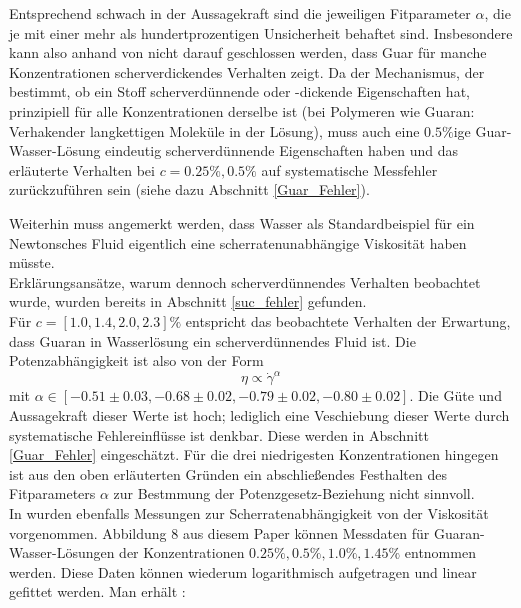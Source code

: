 \documentclass[11pt,a4paper,oneside]{scrartcl}
\begin{document}
Entsprechend schwach in der Aussagekraft sind die jeweiligen Fitparameter $\alpha$, die je mit einer mehr als hundertprozentigen Unsicherheit behaftet sind. Insbesondere kann also anhand von  nicht darauf geschlossen werden, dass Guar für manche Konzentrationen scherverdickendes Verhalten zeigt. Da der Mechanismus, der bestimmt, ob ein Stoff scherverdünnende oder -dickende Eigenschaften hat, prinzipiell für alle Konzentrationen derselbe ist (bei Polymeren wie Guaran: \glqq Verhaken\Grqq der langkettigen Moleküle in der Lösung), muss auch eine $0.5\%$ige Guar-Wasser-Lösung eindeutig scherverdünnende Eigenschaften haben und das erläuterte Verhalten bei $c=0.25\%,0.5\%$ auf systematische Messfehler zurückzuführen sein (siehe dazu Abschnitt \ref{Guar_Fehler}).\par
Weiterhin muss angemerkt werden, dass Wasser als Standardbeispiel für ein Newtonsches Fluid eigentlich eine scherratenunabhängige Viskosität haben müsste. \\ Erklärungsansätze, warum dennoch scherverdünnendes Verhalten beobachtet wurde, wurden bereits in Abschnitt \ref{suc_fehler} gefunden.\\
Für $c=[1.0,1.4,2.0,2.3]\%$ entspricht das beobachtete Verhalten der Erwartung, dass Guaran in Wasserlösung ein scherverdünnendes Fluid ist. Die Potenzabhängigkeit ist also von der Form \begin{equation}\eta\propto\dot\gamma^\alpha\end{equation} mit $\alpha\in[-0.51\pm0.03,-0.68\pm0.02,-0.79\pm0.02,-0.80\pm0.02]$. Die Güte und Aussagekraft dieser Werte ist hoch; lediglich eine Veschiebung dieser Werte durch systematische Fehlereinflüsse ist denkbar. Diese werden in Abschnitt \ref{Guar_Fehler} eingeschätzt. Für die drei niedrigesten Konzentrationen hingegen ist aus den oben erläuterten Gründen ein abschließendes Festhalten des Fitparameters $\alpha$ zur Bestmmung der Potenzgesetz-Beziehung nicht sinnvoll. \\
In \cite{rheology_guar_gum} wurden ebenfalls Messungen zur Scherratenabhängigkeit von der Viskosität vorgenommen. Abbildung 8 aus diesem Paper können Messdaten für Guaran-Wasser-Lösungen der Konzentrationen $0.25\%,0.5\%,1.0\%,1.45\%$ entnommen werden. Diese Daten können wiederum logarithmisch aufgetragen und linear gefittet werden. Man erhält :
\end{document}
